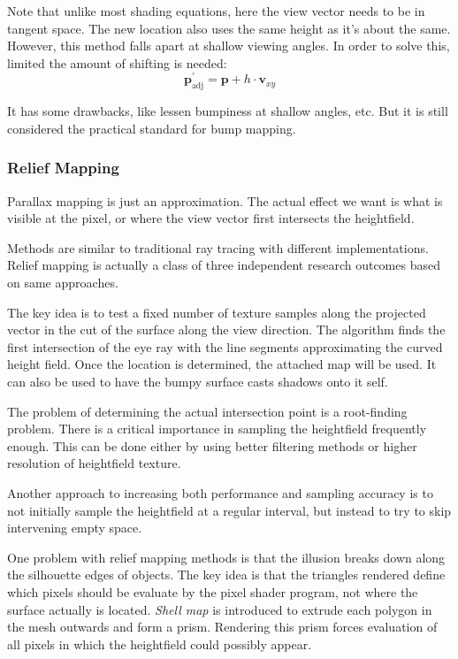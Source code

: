\documentclass[10pt, a4paper]{article}
\begin{document}
        Note that unlike most shading equations, here the view vector needs to be in tangent space. The new location also uses the same height as it's about the same. However, this method falls apart at shallow viewing angles. In order to solve this, limited the amount of shifting is needed: 
        \begin{equation*}
            \textbf{p}_{\text{adj}}^{'} = \textbf{p} + h\cdot \textbf{v}_{xy}
        \end{equation*}

        It has some drawbacks, like lessen bumpiness at shallow angles, etc. But it is still considered the practical standard for bump mapping. 

    
    \subsubsection{Relief Mapping}
        Parallax mapping is just an approximation. The actual effect we want is what is visible at the pixel, or where the view vector first  intersects the heightfield. 

        Methods are similar to traditional ray tracing with different implementations. Relief mapping is actually a class of three independent research outcomes based on same approaches. 

        The key idea is to test a fixed number of texture samples along the projected vector in the cut of the surface along the view direction. The algorithm finds the first intersection of the eye ray with the line segments approximating the curved height field. Once the location is determined, the attached map will be used. It can also be used to have the  bumpy surface casts shadows onto it self.  

        The problem of determining the actual intersection point is a root-finding problem. There is a critical importance in sampling the heightfield frequently enough. This can be done either by using better filtering methods or higher resolution of heightfield texture. 

        Another approach to increasing both performance and sampling accuracy is to not initially sample the heightfield at a regular interval, but instead to try to skip intervening empty space. 

        One problem with relief mapping methods is that the illusion breaks down along the silhouette edges of objects.  The key idea is that the triangles rendered define which pixels should be evaluate by the pixel shader program, not where the surface actually is located. \emph{Shell map} is introduced to extrude each polygon in the mesh outwards and form a prism. Rendering this prism forces evaluation of all pixels in which the heightfield could possibly appear. 
\end{document}
